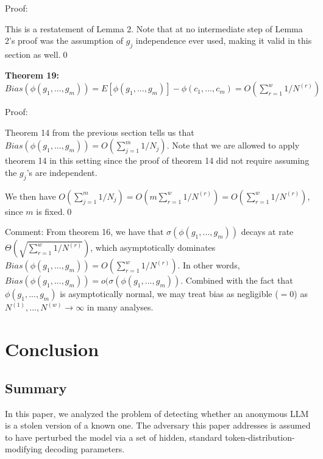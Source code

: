 \documentclass{article}
\begin{document}
Proof:

This is a restatement of Lemma 2. Note that at no intermediate step of Lemma 2's proof was the assumption of $\displaystyle g_{j}$ independence ever used, making it valid in this section as well.\qed 



\textbf{Theorem 19: }$\displaystyle Bias( \phi ( g_{1} ,...,g_{m})) =E[ \phi ( g_{1} ,...,g_{m})] -\phi ( c_{1} ,...,c_{m}) =O\left(\sum _{r=1}^{w} 1/N^{( r)}\right)$

Proof:

Theorem 14 from the previous section tells us that $\displaystyle Bias( \phi ( g_{1} ,...,g_{m})) =O\left(\sum _{j=1}^{m} 1/N_{j}\right)$. Note that we are allowed to apply theorem 14 in this setting since the proof of theorem 14 did not require assuming the $\displaystyle g_{j}$'s are independent.



We then have $\displaystyle O\left(\sum _{j=1}^{m} 1/N_{j}\right) =O\left( m\sum _{r=1}^{w} 1/N^{( r)}\right) =O\left(\sum _{r=1}^{w} 1/N^{( r)}\right)$, since $\displaystyle m$ is fixed.\qed 



Comment: From theorem 16, we have that $\displaystyle \sigma ( \phi ( g_{1} ,...,g_{m}))$ decays at rate $\displaystyle \Theta \left(\sqrt{\sum _{r=1}^{w} 1/N^{( r)}}\right)$, which asymptotically dominates $\displaystyle Bias( \phi ( g_{1} ,...,g_{m})) =O\left(\sum _{r=1}^{w} 1/N^{( r)}\right)$. In other words, $\displaystyle Bias( \phi ( g_{1} ,...,g_{m})) =o( \sigma ( \phi ( g_{1} ,...,g_{m}))$. Combined with the fact that $\displaystyle \phi ( g_{1} ,...,g_{m})$ is asymptotically normal, we may treat bias as negligible ($\displaystyle =0$) as $\displaystyle N^{( 1)} ,...,N^{( w)}\rightarrow \infty $ in many analyses.



\section{Conclusion}
\subsection{Summary}
In this paper, we analyzed the problem of detecting whether an anonymous LLM is a stolen version of a known one. The adversary this paper addresses is assumed to have perturbed the model via a set of hidden, standard token-distribution-modifying decoding parameters.
\end{document}
